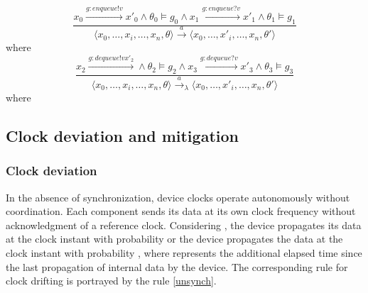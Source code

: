 \begin{boxD}
	      \begin{equation} \label{Enqueue}\frac{ x_{0} \xrightarrow{g:enqueue!v} {x'_{0}} \wedge \theta_{0} \models g_{0} \wedge x_{1} \xrightarrow{g:enqueue?v} {x'_{1}} \wedge \theta_{1} \models g_{1}} { \langle x_{0},\ldots,x_{i}, \ldots,x_{n},\theta\rangle \xrightarrow{a}\langle x_{0},\ldots,x'_{i}, \ldots,x_{n},\theta'\rangle  } \tag{Enqueue} \end{equation} where 
	      \begin{equation}\label{Dequeue}\frac{ x_{2} \xrightarrow{g:dequeue!v{x'_{2}}} \wedge \theta_{2} \models g_{2} \wedge x_{3} \xrightarrow{g:dequeue?v} {x'_{3}} \wedge \theta_{3} \models g_{3} } { \langle x_{0},\ldots,x_{i}, \ldots,x_{n},\theta\rangle \xrightarrow{a}_{\lambda}\langle x_{0},\ldots,x'_{i}, \ldots,x_{n},\theta'\rangle  } \tag{Dequeue} \end{equation} where 
\end{boxD}

\subsection{Clock deviation and mitigation}
\subsubsection{Clock deviation}
In the absence of synchronization, device clocks operate autonomously without coordination. Each component sends its data at its own clock frequency without acknowledgment of a reference clock. Considering , the device propagates its data at the clock instant  with probability  or the device propagates the data at the clock instant  with probability , where  represents the additional elapsed time since the last propagation of internal data by the device. The corresponding rule for clock drifting is portrayed by the rule \ref{unsynch}.

